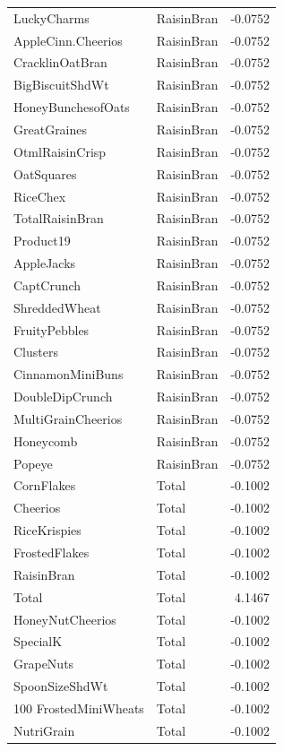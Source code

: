 \begin{longtable}{llr}
LuckyCharms & RaisinBran & -0.0752 \\
AppleCinn.Cheerios & RaisinBran & -0.0752 \\
CracklinOatBran & RaisinBran & -0.0752 \\
BigBiscuitShdWt & RaisinBran & -0.0752 \\
HoneyBunchesofOats & RaisinBran & -0.0752 \\
GreatGraines & RaisinBran & -0.0752 \\
OtmlRaisinCrisp & RaisinBran & -0.0752 \\
OatSquares & RaisinBran & -0.0752 \\
RiceChex & RaisinBran & -0.0752 \\
TotalRaisinBran & RaisinBran & -0.0752 \\
Product19 & RaisinBran & -0.0752 \\
AppleJacks & RaisinBran & -0.0752 \\
CaptCrunch & RaisinBran & -0.0752 \\
ShreddedWheat & RaisinBran & -0.0752 \\
FruityPebbles & RaisinBran & -0.0752 \\
Clusters & RaisinBran & -0.0752 \\
CinnamonMiniBuns & RaisinBran & -0.0752 \\
DoubleDipCrunch & RaisinBran & -0.0752 \\
MultiGrainCheerios & RaisinBran & -0.0752 \\
Honeycomb & RaisinBran & -0.0752 \\
Popeye & RaisinBran & -0.0752 \\
CornFlakes & Total & -0.1002 \\
Cheerios & Total & -0.1002 \\
RiceKrispies & Total & -0.1002 \\
FrostedFlakes & Total & -0.1002 \\
RaisinBran & Total & -0.1002 \\
Total & Total & 4.1467 \\
HoneyNutCheerios & Total & -0.1002 \\
SpecialK & Total & -0.1002 \\
GrapeNuts & Total & -0.1002 \\
SpoonSizeShdWt & Total & -0.1002 \\
100%
FrostedMiniWheats & Total & -0.1002 \\
NutriGrain & Total & -0.1002 \\

\end{longtable}
